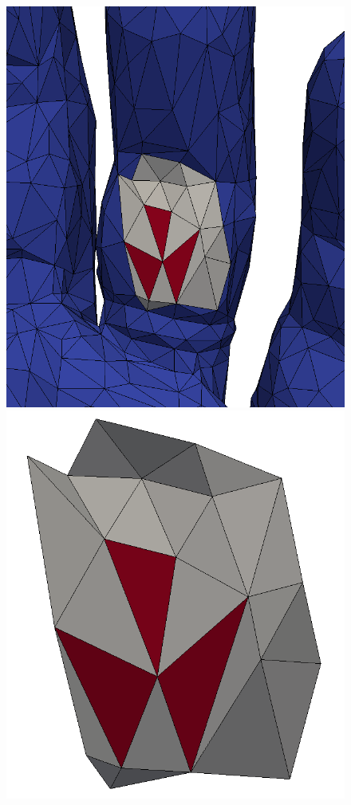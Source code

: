 \documentclass[letter,11pt]{article}
\begin{document}
\begin{figure}
\begin{minipage}{.2\textwidth}
  \end{minipage} 
  \begin{minipage}{0.2\textwidth}
    \centering
    \includegraphics[width=1\linewidth]{../image/patch1.png}
  \end{minipage}
  \begin{minipage}{.2\textwidth}
    \centering
    \includegraphics[width=1\linewidth]{../image/patch2.png}

\end{minipage}
\end{figure}
\end{document}
